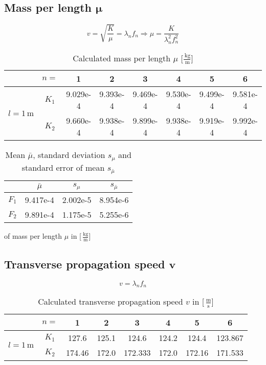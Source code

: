 \documentclass[abstract=on]{scrreprt}
\newcommand{\unit}[1]{\ensuremath{\, \mathrm{#1}}}
\begin{document}
\subsection[Mass per length]{Mass per length $\bm{\mu}$}

\begin{equation}
v=\sqrt{\frac{K}{\mu}}=\lambda_n f_n \Rightarrow \mu = \frac{K}{\lambda_n^2 f_n^2} 
\end{equation}

\begin{table}[H]
	\center
	\begin{tabular}{|c|c|cccccc|}
	\cline{2-8}
	 \multicolumn{1}{c|}{}& $n=$ & 1 & 2 & 3 & 4 & 5 & 6\\  \hline
	\multirow{2}{*}{$l=1\unit{m}$} & $K_1$ & 9.029e-4 & 9.393e-4 & 9.469e-4 & 9.530e-4 & 9.499e-4 & 9.581e-4\\
	& $K_2$ & 9.660e-4 & 9.938e-4 & 9.899e-4 & 9.938e-4 & 9.919e-4 & 9.992e-4\\
	\hline
	\end{tabular}
	\caption{Calculated mass per length $\mu$ [$\frac{\unit{kg}}{\unit{m}}$]}
\end{table}

\begin{table}[H]
\center
\begin{tabular}{|c|ccc|}
\cline{2-4}
\multicolumn{1}{c|}{}& $\bar{\mu}$ & $s_{\mu}$ & $s_{\bar{\mu}}$\\ \hline
$F_1$ & 9.417e-4 & 2.002e-5 & 8.954e-6 \\ \hline
$F_2$ & 9.891e-4 & 1.175e-5 & 5.255e-6\\ \hline
\end{tabular}
\caption{Mean $\bar{\mu}$, standard deviation $s_{\mu}$ and standard error of mean $s_{\bar{\mu}}$} of mass per length $\mu$ in [$\unit{\frac{kg}{m}}$]
\end{table}

\subsection[Transervse propagation speed]{Transverse propagation speed $\bm{v}$}

\begin{equation}
v=\lambda_n f_n
\end{equation}

\begin{table}[H]
	\center
	\begin{tabular}{|c|c|cccccc|}
	\cline{2-8}
	 \multicolumn{1}{c|}{}& $n=$ & 1 & 2 & 3 & 4 & 5 & 6\\  \hline
	\multirow{2}{*}{$l=1\unit{m}$} & $K_1$ & 127.6 & 125.1 & 124.6 & 124.2 & 124.4 & 123.867\\
	& $K_2$ & 174.46 & 172.0 & 172.333 & 172.0 & 172.16 & 171.533\\
	\hline
	\end{tabular}
	\caption{Calculated transverse propagation speed $v$ in [$\unit{\frac{m}{s}}]$}
\end{table}
\end{document}
